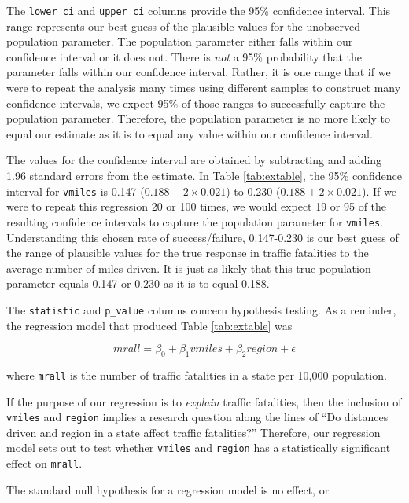 \documentclass[
]{book}
\begin{document}
The \texttt{lower\_ci} and \texttt{upper\_ci} columns provide the 95\% confidence interval. This range represents our best guess of the plausible values for the unobserved population parameter. The population parameter either falls within our confidence interval or it does not. There is \emph{not} a 95\% probability that the parameter falls within our confidence interval. Rather, it is one range that if we were to repeat the analysis many times using different samples to construct many confidence intervals, we expect 95\% of those ranges to successfully capture the population parameter. Therefore, the population parameter is no more likely to equal our estimate as it is to equal any value within our confidence interval.

The values for the confidence interval are obtained by subtracting and adding 1.96 standard errors from the estimate. In Table \ref{tab:extable}, the 95\% confidence interval for \texttt{vmiles} is 0.147 (\(0.188-2\times 0.021\)) to 0.230 (\(0.188+2\times 0.021\)). If we were to repeat this regression 20 or 100 times, we would expect 19 or 95 of the resulting confidence intervals to capture the population parameter for \texttt{vmiles}. Understanding this chosen rate of success/failure, 0.147-0.230 is our best guess of the range of plausible values for the true response in traffic fatalities to the average number of miles driven. It is just as likely that this true population parameter equals 0.147 or 0.230 as it is to equal 0.188.

The \texttt{statistic} and \texttt{p\_value} columns concern hypothesis testing. As a reminder, the regression model that produced Table \ref{tab:extable} was

\begin{equation}
mrall = \beta_0 + \beta_1vmiles + \beta_2region + \epsilon
\label{eq:exmodel}
\end{equation}

where \texttt{mrall} is the number of traffic fatalities in a state per 10,000 population.

If the purpose of our regression is to \emph{explain} traffic fatalities, then the inclusion of \texttt{vmiles} and \texttt{region} implies a research question along the lines of ``Do distances driven and region in a state affect traffic fatalities?'' Therefore, our regression model sets out to test whether \texttt{vmiles} and \texttt{region} has a statistically significant effect on \texttt{mrall}.

The standard null hypothesis for a regression model is no effect, or
\end{document}
